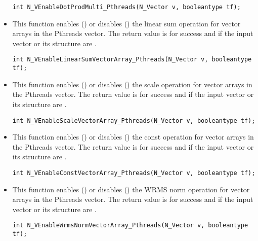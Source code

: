 \begin{itemize}
\verb|int N_VEnableDotProdMulti_Pthreads(N_Vector v, booleantype tf);|


\item {}

This function enables () or disables () the linear sum
operation for vector arrays in the Pthreads vector. The return value is  for
success and  if the input vector or its  structure are .

\verb|int N_VEnableLinearSumVectorArray_Pthreads(N_Vector v, booleantype tf);|


\item {}

This function enables () or disables () the scale
operation for vector arrays in the Pthreads vector. The return value is  for
success and  if the input vector or its  structure are .

\verb|int N_VEnableScaleVectorArray_Pthreads(N_Vector v, booleantype tf);|


\item {}

This function enables () or disables () the const
operation for vector arrays in the Pthreads vector. The return value is  for
success and  if the input vector or its  structure are .

\verb|int N_VEnableConstVectorArray_Pthreads(N_Vector v, booleantype tf);|


\item {}

This function enables () or disables () the WRMS norm
operation for vector arrays in the Pthreads vector. The return value is  for
success and  if the input vector or its  structure are .

\verb|int N_VEnableWrmsNormVectorArray_Pthreads(N_Vector v, booleantype tf);|



\end{itemize}
